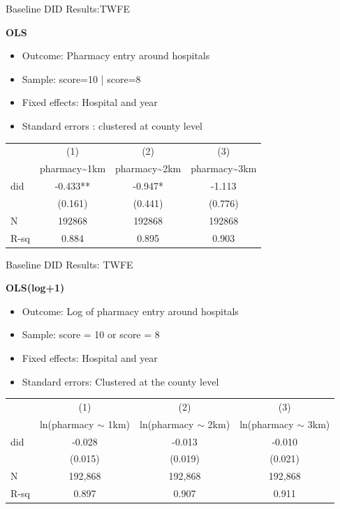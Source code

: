 \documentclass{beamer}
\begin{document}
\begin{frame}{Baseline DID Results:TWFE}

\textbf{OLS}

\begin{itemize}
    \item Outcome: Pharmacy entry around hospitals 
    \item Sample: score=10 | score=8
    \item Fixed effects: Hospital and year
    \item Standard errors : clustered at  county level  
\end{itemize}

\vspace{0.5em}
\centering
\footnotesize
\begin{tabular}{lccc}
\hline
\hline
 & (1) & (2) & (3) \\
 & pharmacy\textasciitilde 1km & pharmacy\textasciitilde 2km & pharmacy\textasciitilde 3km \\
\hline
did & -0.433** & -0.947* & -1.113 \\
 & (0.161) & (0.441) & (0.776) \\
\hline
N & 192868 & 192868 & 192868 \\
R-sq & 0.884 & 0.895 & 0.903 \\
\hline
\hline
\end{tabular}

\end{frame}

\begin{frame}{Baseline DID Results: TWFE}

\textbf{OLS(log+1)}

\begin{itemize}
    \item Outcome: Log of pharmacy entry around hospitals
    \item Sample: score = 10 or score = 8
    \item Fixed effects: Hospital and year
    \item Standard errors: Clustered at the county level
\end{itemize}

\vspace{0.5em}
\centering
\footnotesize
\begin{tabular}{lccc}
\hline
\hline
 & (1) & (2) & (3) \\
 & ln(pharmacy $\sim$ 1km) & ln(pharmacy $\sim$ 2km) & ln(pharmacy $\sim$ 3km) \\
\hline
did & -0.028 & -0.013 & -0.010 \\
    & (0.015) & (0.019) & (0.021) \\
\hline
N & 192,868 & 192,868 & 192,868 \\
R-sq & 0.897 & 0.907 & 0.911 \\
\hline
\hline
\end{tabular}

\end{frame}
\end{document}
